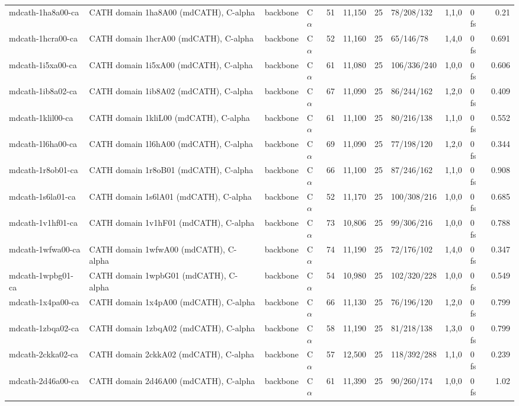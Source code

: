 \documentclass[10pt]{article}
\begin{document}
\begin{small}
\begin{longtable}{p{3.9cm}p{5.2cm}llrrrlrlr}
mdcath-1ha8a00-ca & CATH domain 1ha8A00 (mdCATH), C-alpha & backbone & C$\alpha$ & 51 & 11,150 & 25 & 78/208/132 & 1,1,0 & 0 fs & 0.21\\
mdcath-1hcra00-ca & CATH domain 1hcrA00 (mdCATH), C-alpha & backbone & C$\alpha$ & 52 & 11,160 & 25 & 65/146/78 & 1,4,0 & 0 fs & 0.691\\
mdcath-1i5xa00-ca & CATH domain 1i5xA00 (mdCATH), C-alpha & backbone & C$\alpha$ & 61 & 11,080 & 25 & 106/336/240 & 1,0,0 & 0 fs & 0.606\\
mdcath-1ib8a02-ca & CATH domain 1ib8A02 (mdCATH), C-alpha & backbone & C$\alpha$ & 67 & 11,090 & 25 & 86/244/162 & 1,2,0 & 0 fs & 0.409\\
mdcath-1klil00-ca & CATH domain 1kliL00 (mdCATH), C-alpha & backbone & C$\alpha$ & 61 & 11,100 & 25 & 80/216/138 & 1,1,0 & 0 fs & 0.552\\
mdcath-1l6ha00-ca & CATH domain 1l6hA00 (mdCATH), C-alpha & backbone & C$\alpha$ & 69 & 11,090 & 25 & 77/198/120 & 1,2,0 & 0 fs & 0.344\\
mdcath-1r8ob01-ca & CATH domain 1r8oB01 (mdCATH), C-alpha & backbone & C$\alpha$ & 66 & 11,100 & 25 & 87/246/162 & 1,1,0 & 0 fs & 0.908\\
mdcath-1s6la01-ca & CATH domain 1s6lA01 (mdCATH), C-alpha & backbone & C$\alpha$ & 52 & 11,170 & 25 & 100/308/216 & 1,0,0 & 0 fs & 0.685\\
mdcath-1v1hf01-ca & CATH domain 1v1hF01 (mdCATH), C-alpha & backbone & C$\alpha$ & 73 & 10,806 & 25 & 99/306/216 & 1,0,0 & 0 fs & 0.788\\
mdcath-1wfwa00-ca & CATH domain 1wfwA00 (mdCATH), C-alpha & backbone & C$\alpha$ & 74 & 11,190 & 25 & 72/176/102 & 1,4,0 & 0 fs & 0.347\\
mdcath-1wpbg01-ca & CATH domain 1wpbG01 (mdCATH), C-alpha & backbone & C$\alpha$ & 54 & 10,980 & 25 & 102/320/228 & 1,0,0 & 0 fs & 0.549\\
mdcath-1x4pa00-ca & CATH domain 1x4pA00 (mdCATH), C-alpha & backbone & C$\alpha$ & 66 & 11,130 & 25 & 76/196/120 & 1,2,0 & 0 fs & 0.799\\
mdcath-1zbqa02-ca & CATH domain 1zbqA02 (mdCATH), C-alpha & backbone & C$\alpha$ & 58 & 11,190 & 25 & 81/218/138 & 1,3,0 & 0 fs & 0.799\\
mdcath-2ckka02-ca & CATH domain 2ckkA02 (mdCATH), C-alpha & backbone & C$\alpha$ & 57 & 12,500 & 25 & 118/392/288 & 1,1,0 & 0 fs & 0.239\\
mdcath-2d46a00-ca & CATH domain 2d46A00 (mdCATH), C-alpha & backbone & C$\alpha$ & 61 & 11,390 & 25 & 90/260/174 & 1,0,0 & 0 fs & 1.02\\

\end{longtable}
\end{small}
\end{document}
